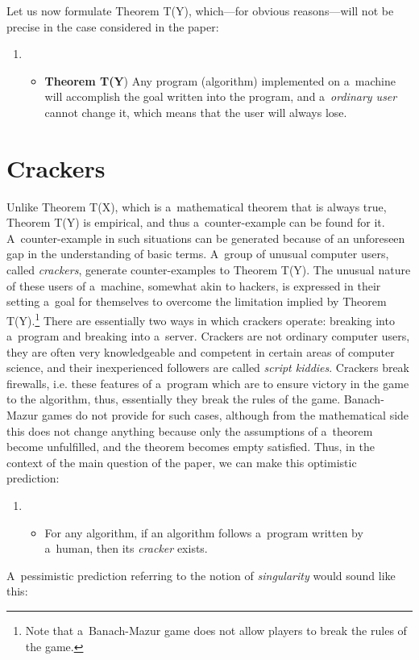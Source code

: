 {Let us now formulate Theorem T(Y), which—for obvious reasons—will not be precise in the case considered in the paper:

\begin{enumerate}
\item \begin{itemize}
\item \textbf{Theorem T(Y}) Any program (algorithm) implemented on a~machine will accomplish the goal written into the program, and a~\textit{ordinary user} cannot change it, which means that the user will always lose.
\end{itemize}
\end{enumerate}
\section{Crackers}
Unlike Theorem T(X), which is a~mathematical theorem that is always true, Theorem T(Y) is empirical, and thus a~counter-example can be found for it. A~counter-example in such situations can be generated because of an unforeseen gap in the understanding of basic terms. A~group of unusual computer users, called \textit{crackers}, generate counter-examples to Theorem T(Y). The unusual nature of these users of a~machine, somewhat akin to hackers, is expressed in their setting a~goal for themselves to overcome the limitation implied by Theorem T(Y).\footnote{ Note that a~Banach-Mazur game does not allow players to break the rules of the game.} There are essentially two ways in which crackers operate: breaking into a~program and breaking into a~server. Crackers are not ordinary computer users, they are often very knowledgeable and competent in certain areas of computer science, and their inexperienced followers are called \textit{script kiddies}. Crackers break firewalls, i.e. these features of a~program which are to ensure victory in the game to the algorithm, thus, essentially they break the rules of the game. Banach-Mazur games do not provide for such cases, although from the mathematical side this does not change anything because only the assumptions of a~theorem become unfulfilled, and the theorem becomes empty satisfied. Thus, in the context of the main question of the paper, we can make this optimistic prediction:

\begin{enumerate}
\item \begin{itemize}
\item For any algorithm, if an algorithm follows a~program written by a~human, then its \textit{cracker} exists.
\end{itemize}
\end{enumerate}
A~pessimistic prediction referring to the notion of \textit{singularity} would sound like this:

}
